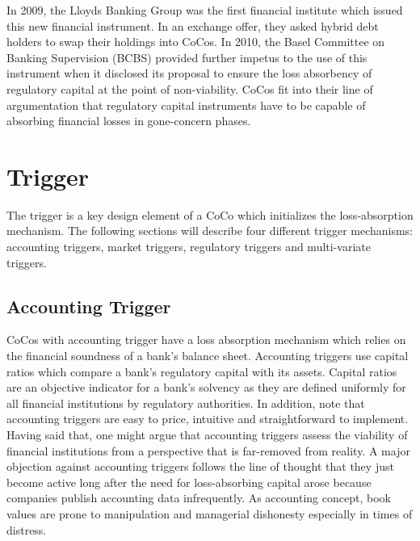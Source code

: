 In 2009, the Lloyds Banking Group was the first financial institute which issued this new financial instrument. In an exchange offer, they asked hybrid debt holders to swap their holdings into CoCos. \citep{de2011pricing} In 2010, the Basel Committee on Banking Supervision (BCBS) provided further impetus to the use of this instrument when it disclosed its proposal to ensure the loss absorbency of regulatory capital at the point of non-viability. CoCos fit into their line of argumentation that regulatory capital instruments have to be capable of absorbing financial losses in gone-concern phases. \citep{basel2010proposal}

\section{Trigger} \label{triggermechanism}

The trigger is a key design element of a CoCo which initializes the loss-absorption mechanism. The following sections will describe four different trigger mechanisms: accounting triggers, market triggers, regulatory triggers and multi-variate triggers.

\subsection{Accounting Trigger}\label{accountingtrigger}

CoCos with accounting trigger have a loss absorption mechanism which relies on the financial soundness of a bank's balance sheet. Accounting triggers use capital ratios which compare a bank's regulatory capital with its assets. Capital ratios are an objective indicator for a bank's solvency as they are defined uniformly for all financial institutions by regulatory authorities. \citep{de2014handbook} In addition, \citet{pazarbasioglu2011contingent} note that accounting triggers are easy to price, intuitive and straightforward to implement. 
Having said that, one might argue that accounting triggers assess the viability of financial institutions from a perspective that is far-removed from reality. A major objection against accounting triggers follows the line of thought that they just become active long after the need for loss-absorbing capital arose because companies publish accounting data infrequently. \citep{de2011pricing} As accounting concept, book values are prone to manipulation and managerial dishonesty especially in times of distress. \citep{mcdonald2013contingent}\\ 

